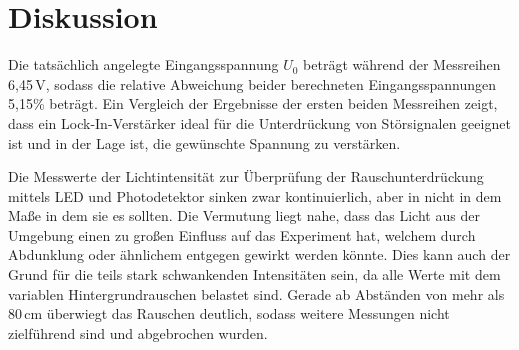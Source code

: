 \section{Diskussion}
\label{sec:Diskussion}
Die tatsächlich angelegte Eingangsspannung $U_\text{0}$
beträgt während der Messreihen 6,45\,V, sodass die relative Abweichung beider berechneten
Eingangsspannungen 5,15\% beträgt. Ein Vergleich der Ergebnisse der ersten beiden Messreihen zeigt, dass ein 
Lock-In-Verstärker ideal für die Unterdrückung von Störsignalen geeignet ist und in der Lage ist,
die gewünschte Spannung zu verstärken.

Die Messwerte der Lichtintensität zur Überprüfung der Rauschunterdrückung mittels LED und Photodetektor sinken
zwar kontinuierlich, aber in nicht in dem Maße in dem sie es sollten. Die Vermutung liegt nahe,
dass das Licht aus der Umgebung einen zu großen Einfluss auf das Experiment hat, welchem durch
Abdunklung oder ähnlichem entgegen gewirkt werden könnte. Dies kann auch der Grund für die teils
stark schwankenden Intensitäten sein, da alle Werte mit dem variablen Hintergrundrauschen belastet sind.
Gerade ab Abständen von mehr als 80\,cm überwiegt das Rauschen deutlich, sodass weitere Messungen
nicht zielführend sind und abgebrochen wurden.